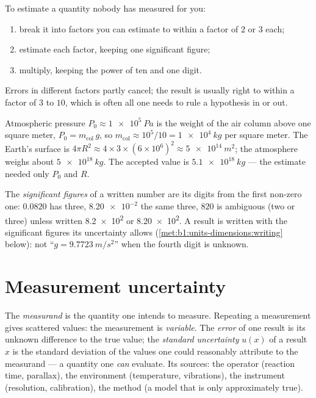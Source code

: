 \begin{method}[Estimating]\label{met:b1:units-dimensions:estimate}
To estimate a quantity nobody has measured for you:
\begin{enumerate}
  \item break it into factors you can estimate to within a factor of
        $2$ or $3$ each;
  \item estimate each factor, keeping one significant figure;
  \item multiply, keeping the power of ten and one digit.
\end{enumerate}
Errors in different factors partly cancel; the result is usually right
to within a factor of $3$ to $10$, which is often all one needs to rule
a hypothesis in or out.
\end{method}

\begin{example}\label{ex:b1:units-dimensions:atmosphere}
Atmospheric pressure $P_0 \approx \qty{1e5}{Pa}$ is the weight of the
air column above one square meter, $P_0 = m_{\text{col}}\,g$, so
$m_{\text{col}} \approx 10^5/10 = \qty{1e4}{kg}$ per square meter. The
Earth's surface is $4\pi R^2 \approx 4 \times 3 \times (6\times10^6)^2
\approx \qty{5e14}{m^2}$; the atmosphere weighs about
$\qty{5e18}{kg}$. The accepted value is $\qty{5.1e18}{kg}$ --- the
estimate needed only $P_0$ and $R$.
\end{example}

\begin{definition}\label{def:b1:units-dimensions:sigfig}
The \emph{significant figures} of a written number are its digits from
the first non-zero one: $0.0820$ has three, $\num{8.20e-2}$ the same
three, $820$ is ambiguous (two or three) unless written \num{8.2e2} or
\num{8.20e2}. A result is written with the significant figures its
uncertainty allows (\cref{met:b1:units-dimensions:writing} below):
not ``$g = \qty{9.7723}{m/s^2}$'' when the fourth digit is unknown.
\end{definition}

\section{Measurement uncertainty}

\begin{definition}\label{def:b1:units-dimensions:uncertainty}
The \emph{measurand} is the quantity one intends to measure. Repeating
a measurement gives scattered values: the measurement is
\emph{variable}. The \emph{error} of one result is its unknown
difference to the true value; the \emph{standard uncertainty} $u(x)$ of
a result $x$ is the standard deviation of the values one could
reasonably attribute to the measurand --- a quantity one \emph{can}
evaluate. Its sources: the operator (reaction time, parallax), the
environment (temperature, vibrations), the instrument (resolution,
calibration), the method (a model that is only approximately true).
\end{definition}

